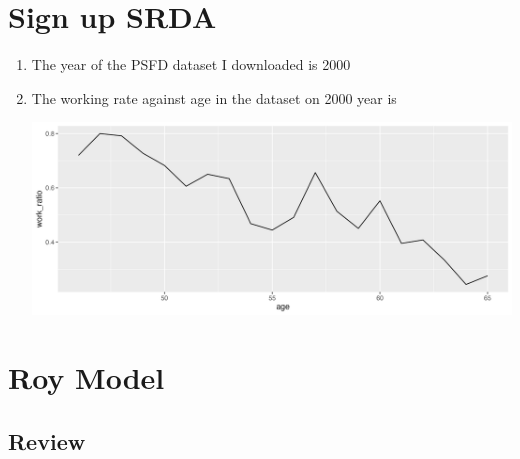 \documentclass[11pt]{article}
\begin{document}
\section{Sign up SRDA}

    \begin{enumerate}

        \item The year of the PSFD dataset I downloaded is 2000
        
        \item The working rate against age in the dataset on 2000 year is
            \begin{center}
                \includegraphics[scale = 0.6]{Q3_4_workratio.png}
            \end{center}
            

    \end{enumerate}



\section{Roy Model}

    \subsection{Review}
\end{document}
